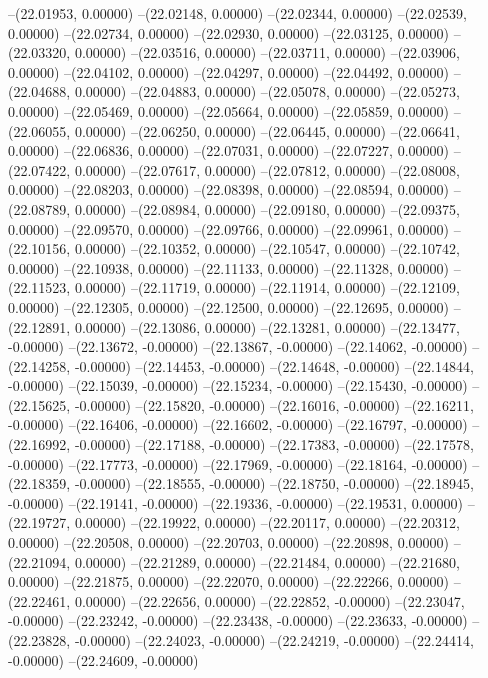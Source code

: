 --(22.01953, 0.00000)
--(22.02148, 0.00000)
--(22.02344, 0.00000)
--(22.02539, 0.00000)
--(22.02734, 0.00000)
--(22.02930, 0.00000)
--(22.03125, 0.00000)
--(22.03320, 0.00000)
--(22.03516, 0.00000)
--(22.03711, 0.00000)
--(22.03906, 0.00000)
--(22.04102, 0.00000)
--(22.04297, 0.00000)
--(22.04492, 0.00000)
--(22.04688, 0.00000)
--(22.04883, 0.00000)
--(22.05078, 0.00000)
--(22.05273, 0.00000)
--(22.05469, 0.00000)
--(22.05664, 0.00000)
--(22.05859, 0.00000)
--(22.06055, 0.00000)
--(22.06250, 0.00000)
--(22.06445, 0.00000)
--(22.06641, 0.00000)
--(22.06836, 0.00000)
--(22.07031, 0.00000)
--(22.07227, 0.00000)
--(22.07422, 0.00000)
--(22.07617, 0.00000)
--(22.07812, 0.00000)
--(22.08008, 0.00000)
--(22.08203, 0.00000)
--(22.08398, 0.00000)
--(22.08594, 0.00000)
--(22.08789, 0.00000)
--(22.08984, 0.00000)
--(22.09180, 0.00000)
--(22.09375, 0.00000)
--(22.09570, 0.00000)
--(22.09766, 0.00000)
--(22.09961, 0.00000)
--(22.10156, 0.00000)
--(22.10352, 0.00000)
--(22.10547, 0.00000)
--(22.10742, 0.00000)
--(22.10938, 0.00000)
--(22.11133, 0.00000)
--(22.11328, 0.00000)
--(22.11523, 0.00000)
--(22.11719, 0.00000)
--(22.11914, 0.00000)
--(22.12109, 0.00000)
--(22.12305, 0.00000)
--(22.12500, 0.00000)
--(22.12695, 0.00000)
--(22.12891, 0.00000)
--(22.13086, 0.00000)
--(22.13281, 0.00000)
--(22.13477, -0.00000)
--(22.13672, -0.00000)
--(22.13867, -0.00000)
--(22.14062, -0.00000)
--(22.14258, -0.00000)
--(22.14453, -0.00000)
--(22.14648, -0.00000)
--(22.14844, -0.00000)
--(22.15039, -0.00000)
--(22.15234, -0.00000)
--(22.15430, -0.00000)
--(22.15625, -0.00000)
--(22.15820, -0.00000)
--(22.16016, -0.00000)
--(22.16211, -0.00000)
--(22.16406, -0.00000)
--(22.16602, -0.00000)
--(22.16797, -0.00000)
--(22.16992, -0.00000)
--(22.17188, -0.00000)
--(22.17383, -0.00000)
--(22.17578, -0.00000)
--(22.17773, -0.00000)
--(22.17969, -0.00000)
--(22.18164, -0.00000)
--(22.18359, -0.00000)
--(22.18555, -0.00000)
--(22.18750, -0.00000)
--(22.18945, -0.00000)
--(22.19141, -0.00000)
--(22.19336, -0.00000)
--(22.19531, 0.00000)
--(22.19727, 0.00000)
--(22.19922, 0.00000)
--(22.20117, 0.00000)
--(22.20312, 0.00000)
--(22.20508, 0.00000)
--(22.20703, 0.00000)
--(22.20898, 0.00000)
--(22.21094, 0.00000)
--(22.21289, 0.00000)
--(22.21484, 0.00000)
--(22.21680, 0.00000)
--(22.21875, 0.00000)
--(22.22070, 0.00000)
--(22.22266, 0.00000)
--(22.22461, 0.00000)
--(22.22656, 0.00000)
--(22.22852, -0.00000)
--(22.23047, -0.00000)
--(22.23242, -0.00000)
--(22.23438, -0.00000)
--(22.23633, -0.00000)
--(22.23828, -0.00000)
--(22.24023, -0.00000)
--(22.24219, -0.00000)
--(22.24414, -0.00000)
--(22.24609, -0.00000)
